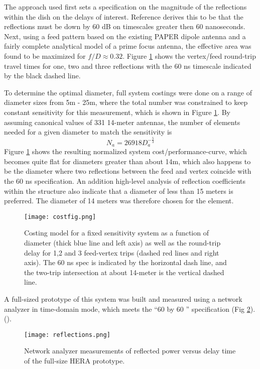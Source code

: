 \documentclass{ICEAA-IEEE_APWC}
\begin{document}
The approach used first sets a specification on the magnitude of the reflections within the dish on the delays of interest.  Reference \cite{heraMemo5} derives this to be that the reflections must be down by 60 dB on timescales greater then 60 nanoseconds.  
Next, using a feed pattern based on the existing PAPER dipole antenna and a fairly complete analytical model of a prime focus antenna, the effective area was found to be maximized for $f/D \approx 0.32$.  Figure \ref{fig:costfig} shows the vertex/feed round-trip travel times for one, two and three reflections with the 60 ns timescale indicated by the black dashed line. 

To determine the optimal diameter, full system costings were done on a range of diameter sizes from 5m - 25m, where the total number was constrained to keep constant sensitivity for this measurement, which is shown in Figure \ref{fig:costfig}.  By assuming canonical values of 331 14-meter antennas, the number of elements needed for a given diameter to match the sensitivity is
\begin{equation}
N_a = 26918D_a^{-\frac{5}{3}}
\end{equation}
Figure \ref{fig:costfig} shows the resulting normalized system cost/performance-curve, which becomes quite flat for diameters greater than about 14m, which also happens to be the diameter where two reflections between the feed and vertex coincide with the 60 ns specification.  An addition high-level analysis of reflection coefficients within the structure also indicate that a diameter of less than 15 meters is preferred.  The diameter of 14 meters was therefore chosen for the element.

\begin{figure}[t]
\centerline{
\texttt{[image: costfig.png]} 
}
\caption{\small Costing model for a fixed sensitivity system as a function of diameter (thick blue line and left axis) as well as the round-trip delay for 1,2 and 3 feed-vertex trips (dashed red lines and right axis).  The 60 ns spec is indicated by the horizontal dash line, and the two-trip intersection at about 14-meter is the vertical dashed line.
\label{fig:costfig}}
\end{figure}

A full-sized prototype of this system was built and measured using a network analyzer in time-domain mode, which meets the ``60 by 60 '' specification (Fig \ref{fig:refl}). (\cite{heraMemo5}).

\begin{figure}[t]
\centerline{
\texttt{[image: reflections.png]} 
}
\caption{\small Network analyzer measurements of reflected power versus delay time of the full-size HERA prototype.
\label{fig:refl}}
\end{figure}
\end{document}

